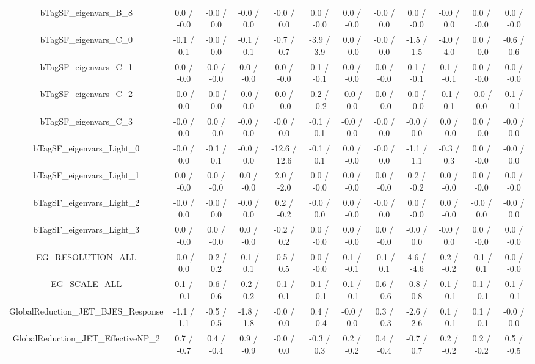 \begin{table}[htbp]
\begin{center}
\begin{tabular}{|c|c|c|c|c|c|c|c|c|c|c|c|}
  bTagSF_eigenvars_B_8 & 0.0 / -0.0 & -0.0 / 0.0 & -0.0 / 0.0 & -0.0 / 0.0 & 0.0 / -0.0 & 0.0 / -0.0 & -0.0 / 0.0 & 0.0 / -0.0 & -0.0 / 0.0 & 0.0 / -0.0 & 0.0 / -0.0 \\ 
  bTagSF_eigenvars_C_0 & -0.1 / 0.1 & -0.0 / 0.0 & -0.1 / 0.1 & -0.7 / 0.7 & -3.9 / 3.9 & 0.0 / -0.0 & -0.0 / 0.0 & -1.5 / 1.5 & -4.0 / 4.0 & 0.0 / -0.0 & -0.6 / 0.6 \\ 
  bTagSF_eigenvars_C_1 & 0.0 / -0.0 & 0.0 / -0.0 & 0.0 / -0.0 & 0.0 / -0.0 & 0.1 / -0.1 & 0.0 / -0.0 & 0.0 / -0.0 & 0.1 / -0.1 & 0.1 / -0.1 & 0.0 / -0.0 & 0.0 / -0.0 \\ 
  bTagSF_eigenvars_C_2 & -0.0 / 0.0 & -0.0 / 0.0 & -0.0 / 0.0 & 0.0 / -0.0 & 0.2 / -0.2 & -0.0 / 0.0 & 0.0 / -0.0 & 0.0 / -0.0 & -0.1 / 0.1 & -0.0 / 0.0 & 0.1 / -0.1 \\ 
  bTagSF_eigenvars_C_3 & -0.0 / 0.0 & 0.0 / -0.0 & -0.0 / 0.0 & -0.0 / 0.0 & -0.1 / 0.1 & -0.0 / 0.0 & -0.0 / 0.0 & -0.0 / 0.0 & 0.0 / -0.0 & 0.0 / -0.0 & -0.0 / 0.0 \\ 
  bTagSF_eigenvars_Light_0 & -0.0 / 0.0 & -0.1 / 0.1 & -0.0 / 0.0 & -12.6 / 12.6 & -0.1 / 0.1 & 0.0 / -0.0 & -0.0 / 0.0 & -1.1 / 1.1 & -0.3 / 0.3 & 0.0 / -0.0 & -0.0 / 0.0 \\ 
  bTagSF_eigenvars_Light_1 & 0.0 / -0.0 & 0.0 / -0.0 & 0.0 / -0.0 & 2.0 / -2.0 & 0.0 / -0.0 & 0.0 / -0.0 & 0.0 / -0.0 & 0.2 / -0.2 & 0.0 / -0.0 & 0.0 / -0.0 & 0.0 / -0.0 \\ 
  bTagSF_eigenvars_Light_2 & -0.0 / 0.0 & -0.0 / 0.0 & -0.0 / 0.0 & 0.2 / -0.2 & -0.0 / 0.0 & 0.0 / -0.0 & -0.0 / 0.0 & 0.0 / -0.0 & 0.0 / -0.0 & -0.0 / 0.0 & -0.0 / 0.0 \\ 
  bTagSF_eigenvars_Light_3 & 0.0 / -0.0 & 0.0 / -0.0 & 0.0 / -0.0 & -0.2 / 0.2 & 0.0 / -0.0 & 0.0 / -0.0 & 0.0 / -0.0 & -0.0 / 0.0 & -0.0 / 0.0 & 0.0 / -0.0 & 0.0 / -0.0 \\ 
  EG_RESOLUTION_ALL & -0.0 / 0.0 & -0.2 / 0.2 & -0.1 / 0.1 & -0.5 / 0.5 & 0.0 / -0.0 & 0.1 / -0.1 & -0.1 / 0.1 & 4.6 / -4.6 & 0.2 / -0.2 & -0.1 / 0.1 & 0.0 / -0.0 \\ 
  EG_SCALE_ALL & 0.1 / -0.1 & -0.6 / 0.6 & -0.2 / 0.2 & -0.1 / 0.1 & 0.1 / -0.1 & 0.1 / -0.1 & 0.6 / -0.6 & -0.8 / 0.8 & 0.1 / -0.1 & 0.1 / -0.1 & 0.1 / -0.1 \\ 
  GlobalReduction_JET_BJES_Response & -1.1 / 1.1 & -0.5 / 0.5 & -1.8 / 1.8 & -0.0 / 0.0 & 0.4 / -0.4 & -0.0 / 0.0 & 0.3 / -0.3 & -2.6 / 2.6 & 0.1 / -0.1 & 0.1 / -0.1 & -0.0 / 0.0 \\ 
  GlobalReduction_JET_EffectiveNP_2 & 0.7 / -0.7 & 0.4 / -0.4 & 0.9 / -0.9 & -0.0 / 0.0 & -0.3 / 0.3 & 0.2 / -0.2 & 0.4 / -0.4 & -0.7 / 0.7 & 0.2 / -0.2 & 0.2 / -0.2 & 0.5 / -0.5 \\ 

\end{tabular}
\end{center}
\end{table}
